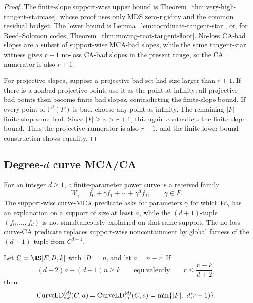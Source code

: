 \begin{proof}
The finite-slope support-wise upper bound is Theorem~\ref{thm:very-high-tangent-staircase},
whose proof uses only MDS zero-rigidity and the common residual budget.  The
lower bound is Lemma~\ref{lem:coordinate-tangent-star}, or, for Reed--Solomon
codes, Theorem~\ref{thm:moving-root-tangent-floor}.  No-loss CA-bad slopes are a
subset of support-wise MCA-bad slopes, while the same tangent-star witness gives
\(r+1\) no-loss CA-bad slopes in the present range, so the CA numerator is also
\(r+1\).

For projective slopes, suppose a projective bad set had size larger than
\(r+1\).  If there is a nonbad projective point, use it as the point at infinity;
all projective bad points then become finite bad slopes, contradicting the
finite-slope bound.  If every point of \(\mathbb P^1(F)\) is bad, choose any
point as infinity.  The remaining \(|F|\) finite slopes are bad.  Since
\(|F|\ge n>r+1\), this again contradicts the finite-slope bound.  Thus the
projective numerator is also \(r+1\), and the finite lower-bound construction
shows equality.
\end{proof}

\subsection{Degree-\texorpdfstring{$d$}{d} curve MCA/CA}

For an integer \(d\ge1\), a finite-parameter power curve is a received family
\[
  W_\gamma=f_0+\gamma f_1+\cdots+\gamma^d f_d,
  \qquad \gamma\in F .
\]
The support-wise curve-MCA predicate asks for parameters \(\gamma\) for which
\(W_\gamma\) has an explanation on a support of size at least \(a\), while the
\((d+1)\)-tuple \((f_0,\ldots,f_d)\) is not simultaneously explained on that
same support.  The no-loss curve-CA predicate replaces support-wise
noncontainment by global farness of the \((d+1)\)-tuple from \(C^{d+1}\).

\begin{theorem}
\label{thm:uniform-curve-staircase}
Let \(C=\RS[F,D,k]\) with \(|D|=n\), and let \(a=n-r\).  If
\[
  (d+2)a-(d+1)n\ge k
  \qquad\text{equivalently}\qquad
  r\le \frac{n-k}{d+2},
\]
then
\[
  \operatorname{CurveLD}_{\rm sw}^{(d)}(C,a)
  =
  \operatorname{CurveLD}_{\rm ca}^{(d)}(C,a)
  =
  \min\{|F|,\ d(r+1)\} .
\]
\end{theorem}

